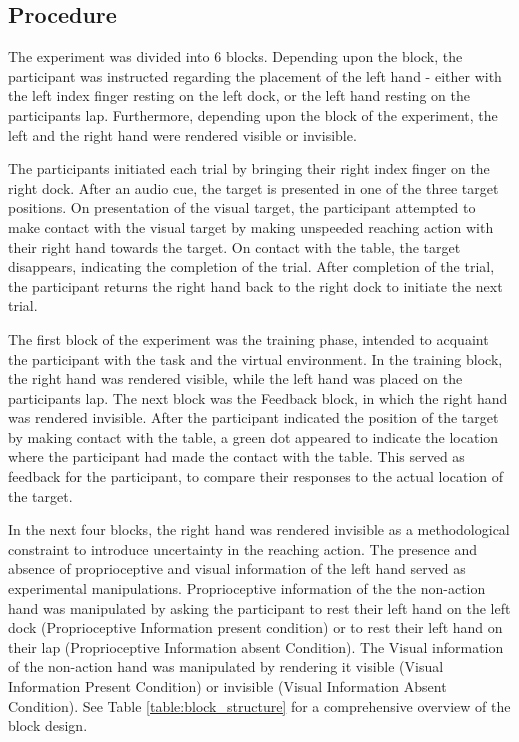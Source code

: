 \subsection{Procedure}




The experiment was divided into 6 blocks. Depending upon the block, the participant was instructed regarding the placement of the left hand - either with the left index finger resting on the left dock, or the left hand resting on the participants lap. Furthermore, depending upon the block of the experiment, the left and the right hand were rendered visible or invisible.  

The participants initiated each trial by bringing their right index finger on the right dock. After an audio cue, the target is presented in one of the three target positions. On presentation of the visual target, the participant attempted to make contact with the visual target by making unspeeded reaching action with their right hand towards the target. On contact with the table, the target disappears, indicating the completion of the trial. After completion of the trial, the participant returns the right hand back to the right dock to initiate the next trial.  

The first block of the experiment was the training phase, intended to acquaint the participant with the task and the virtual environment. In the training block, the right hand was rendered visible, while the left hand was placed on the participants lap. The next block was the Feedback block, in which the right hand was rendered invisible. After the participant indicated the position of the target by making contact with the table, a green dot appeared to indicate the location where the participant had made the contact with the table. This served as feedback for the participant, to compare their responses to the actual location of the target.

In the next four blocks, the right hand was rendered invisible as a methodological constraint to introduce uncertainty in the reaching action. The presence and absence of proprioceptive and visual information of the left hand served as experimental manipulations. Proprioceptive information of the the non-action hand was manipulated by asking the participant to rest their left hand on the left dock (Proprioceptive Information present condition) or to rest their left hand on their lap (Proprioceptive Information absent Condition). The Visual information of the non-action hand was manipulated by rendering it visible (Visual Information Present Condition) or invisible (Visual Information Absent Condition). See Table \ref{table:block_structure} for a comprehensive overview of the block design.


